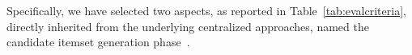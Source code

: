 %
%
%
%

Specifically, we have selected two aspects, as reported in Table~\ref{tab:evalcriteria}, directly inherited from the underlying centralized approaches, named the candidate itemset generation phase~\cite{goethals2003survey}. 

